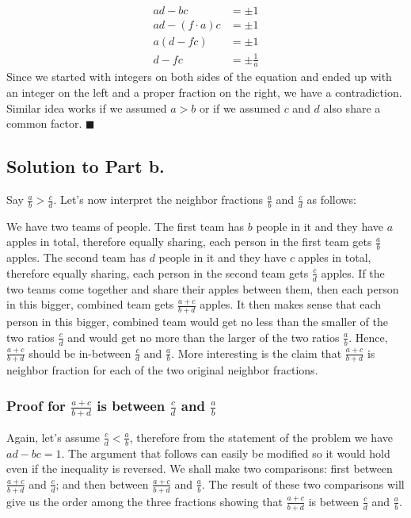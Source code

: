 \documentclass{article}
\begin{document}
\begin{displaymath}
\begin{split}
	ad - bc         & = \pm 1\\
	ad-(f \cdot a)c & = \pm 1\\
	a(d-fc)         & = \pm 1\\
	d-fc            & = \pm \frac{1}{a}
\end{split}
\end{displaymath}
Since we started with integers on both sides of the equation and ended up with an integer on the left and a proper fraction on the right, we have a contradiction. Similar idea works if we assumed $a > b$ or if we assumed $c$ and $d$ also share a common factor. $\blacksquare$

\subsection*{Solution to Part b.}
Say $\frac{a}{b} > \frac{c}{d}$. Let's now interpret the neighbor fractions $\frac{a}{b}$ and $\frac{c}{d}$ as follows: 

We have two teams of people. The first team has $b$ people in it and they have $a$ apples in total, therefore equally sharing, each person in the first team gets $\frac{a}{b}$ apples. The second team has $d$ people in it and they have $c$ apples in total, therefore equally sharing, each person in the second team gets $\frac{c}{d}$ apples. If the two teams come together and share their apples between them, then each person in this bigger, combined team gets $\frac{a+c}{b+d}$ apples. It then makes sense that each person in this bigger, combined team would get no less than the smaller of the two ratios $\frac{c}{d}$ and would get no more than the larger of the two ratios $\frac{a}{b}$. Hence, $\frac{a+c}{b+d}$ should be in-between $\frac{c}{d}$ and $\frac{a}{b}$. More interesting is the claim that $\frac{a+c}{b+d}$ is neighbor fraction for each of the two original neighbor fractions.

\subsubsection*{Proof for $\frac{a+c}{b+d}$ is between $\frac{c}{d}$ and $\frac{a}{b}$}

Again, let's assume $\frac{c}{d} < \frac{a}{b}$, therefore from the statement of the problem we have $ad-bc = 1$. The argument that follows can easily be modified so it would hold even if the inequality is reversed. We shall make two comparisons: first between $\frac{a+c}{b+d}$ and $\frac{c}{d}$; and then between $\frac{a+c}{b+d}$ and $\frac{a}{b}$. The result of these two comparisons will give us the order among the three fractions showing that $\frac{a+c}{b+d}$ is between $\frac{c}{d}$ and $\frac{a}{b}$.
\end{document}
